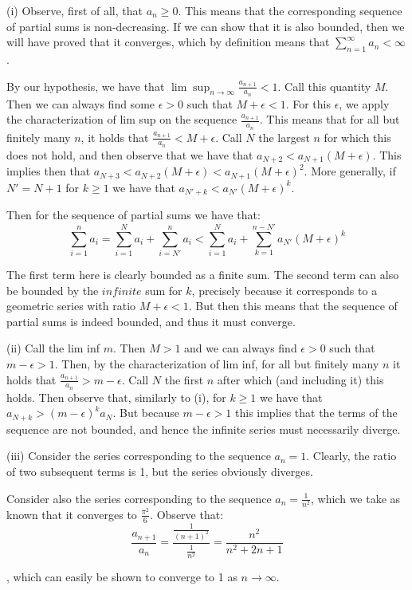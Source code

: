 \begin{solution}

    (i) Observe, first of all, that $a_n \geq 0$. This means that the corresponding sequence of partial sums is non-decreasing. If we can show that it is also bounded, then we will have proved that it converges, which by definition means that $\sum_{n=1}^{\infty} a_n < \infty$.

    By our hypothesis, we have that $\lim \sup_{n \rightarrow \infty} \frac{a_{n+1}}{a_n} < 1$. Call this quantity $M$. Then we can always find some $\epsilon > 0$ such that $ M + \epsilon < 1$. For this $\epsilon$, we apply the characterization of lim sup on the sequence $\frac{a_{n+1}}{a_n}$. This means that for all but finitely many $n$, it holds that $\frac{a_{n+1}}{a_n} < M + \epsilon$. Call $N$ the largest $n$ for which this does not hold, and then observe that we have that $a_{N+2} < a_{N+1}(M + \epsilon)$. This implies then that $a_{N+3} < a_{N+2}(M + \epsilon) < a_{N+1}(M+\epsilon)^2$. More generally, if $N' = N+1$ for $k \geq 1$ we have that $a_{N'+k} < a_{N'}(M+\epsilon)^k$. 

    Then for the sequence of partial sums we have that:
    $$\sum_{i=1}^{n} a_i = \sum_{i=1}^{N} a_i + \sum_{i=N'}^{n} a_i < \sum_{i=1}^{N}a_i + \sum_{k=1}^{n - N'} a_{N'}(M+ \epsilon)^k$$

    The first term here is clearly bounded as a finite sum. The second term can also be bounded by the $\textit{infinite}$ sum for $k$, precisely because it corresponds to a geometric series with ratio $M + \epsilon < 1$. But then this means that the sequence of partial sums is indeed bounded, and thus it must converge.

    (ii) Call the lim inf $m$. Then $M > 1$ and we can always find $\epsilon > 0$ such that $m - \epsilon > 1$. Then, by the characterization of lim inf, for all but finitely many $n$ it holds that $\frac{a_{n+1}}{a_n} > m - \epsilon$. Call $N$ the first $n$ after which (and including it) this holds. Then observe that, similarly to (i), for $k \geq 1$ we have that $a_{N+k} > (m - \epsilon)^k a_N$. But because $m - \epsilon > 1$ this implies that the terms of the sequence are not bounded, and hence the infinite series must necessarily diverge.

    (iii) Consider the series corresponding to the sequence $a_n = 1$. Clearly, the ratio of two subsequent terms is 1, but the series obviously diverges.

    Consider also the series corresponding to the sequence $a_n = \frac{1}{n^2}$, which we take as known that it converges to $\frac{\pi^2}{6}$. Observe that:
    $$\frac{a_{n+1}}{a_n} = \frac{\frac{1}{(n+1)^2}}{\frac{1}{n^2}} = \frac{n^2}{n^2 + 2n+1}$$

    , which can easily be shown to converge to 1 as $n \rightarrow \infty$.
    
\end{solution}

